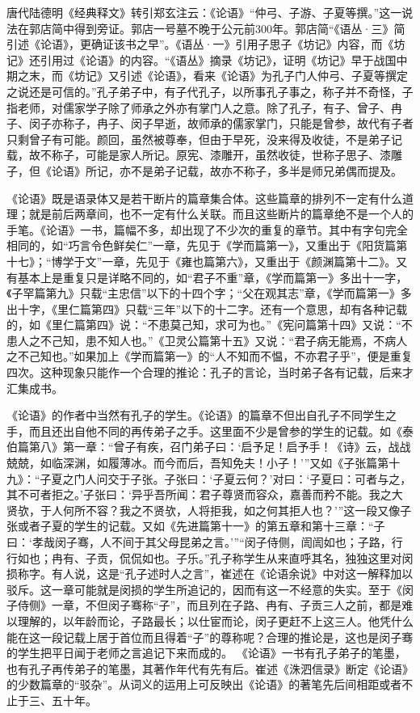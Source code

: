 \documentclass[a4paper,12pt,UTF8,twoside]{ctexbook}
\begin{document}
唐代陆德明《经典释文》转引郑玄注云：《论语》“仲弓、子游、子夏等撰。”这一说法在郭店简中得到旁证。郭店一号墓不晚于公元前300年。郭店简“《语丛·三》简引述《论语》，更确证该书之早”。《语丛·一》引用子思子《坊记》内容，而《坊记》还引用过《论语》的内容。“《语丛》摘录《坊记》，证明《坊记》早于战国中期之末，而《坊记》又引述《论语》，看来《论语》为孔子门人仲弓、子夏等撰定之说还是可信的。”孔子弟子中，有子代孔子，以所事孔子事之，称子并不奇怪，子指老师，对儒家学子除了师承之外亦有掌门人之意。除了孔子，有子、曾子、冉子、闵子亦称子，冉子、闵子早逝，故师承的儒家掌门，只能是曾参，故代有子者只剩曾子有可能。颜回，虽然被尊奉，但由于早死，没来得及收徒，不是弟子记载，故不称子，可能是家人所记。原宪、漆雕开，虽然收徒，世称子思子、漆雕子，但《论语》所记，亦不是弟子记载，故亦不称子，多半是师兄弟偶而提及。

《论语》既是语录体又是若干断片的篇章集合体。这些篇章的排列不一定有什么道理；就是前后两章间，也不一定有什么关联。而且这些断片的篇章绝不是一个人的手笔。《论语》一书，篇幅不多，却出现了不少次的重复的章节。其中有字句完全相同的，如“巧言令色鲜矣仁”一章，先见于《学而篇第一》，又重出于《阳货篇第十七》；“博学于文”一章，先见于《雍也篇第六》，又重出于《颜渊篇第十二》。又有基本上是重复只是详略不同的，如“君子不重”章，《学而篇第一》多出十一字，《子罕篇第九》只载“主忠信”以下的十四个字；“父在观其志”章，《学而篇第一》多出十字，《里仁篇第四》只载“三年”以下的十二字。还有一个意思，却有各种记载的，如《里仁篇第四》说：“不患莫己知，求可为也。”《宪问篇第十四》又说：“不患人之不己知，患不知人也。”《卫灵公篇第十五》又说：“君子病无能焉，不病人之不己知也。”如果加上《学而篇第一》的“人不知而不愠，不亦君子乎”，便是重复四次。这种现象只能作一个合理的推论：孔子的言论，当时弟子各有记载，后来才汇集成书。

《论语》的作者中当然有孔子的学生。《论语》的篇章不但出自孔子不同学生之手，而且还出自他不同的再传弟子之手。这里面不少是曾参的学生的记载。如《泰伯篇第八》第一章：“曾子有疾，召门弟子曰：‘启予足！启予手！《诗》云，战战兢兢，如临深渊，如履薄冰。而今而后，吾知免夫！小子！’”又如《子张篇第十九》：“子夏之门人问交于子张。子张曰：‘子夏云何？’对曰：‘子夏曰：可者与之，其不可者拒之。’子张曰：‘异乎吾所闻：君子尊贤而容众，嘉善而矜不能。我之大贤欤，于人何所不容？我之不贤欤，人将拒我，如之何其拒人也？’”这一段又像子张或者子夏的学生的记载。又如《先进篇第十一》的第五章和第十三章：“子曰：‘孝哉闵子骞，人不间于其父母昆弟之言。’”“闵子侍侧，訚訚如也；子路，行行如也；冉有、子贡，侃侃如也。子乐。”孔子称学生从来直呼其名，独独这里对闵损称字。有人说，这是“孔子述时人之言”，崔述在《论语余说》中对这一解释加以驳斥。这一章可能就是闵损的学生所追记的，因而有这一不经意的失实。至于《闵子侍侧》一章，不但闵子骞称“子”，而且列在子路、冉有、子贡三人之前，都是难以理解的，以年龄而论，子路最长；以仕宦而论，闵子更赶不上这三人。他凭什么能在这一段记载上居于首位而且得着“子”的尊称呢？合理的推论是，这也是闵子骞的学生把平日闻于老师之言追记下来而成的。
《论语》一书有孔子弟子的笔墨，也有孔子再传弟子的笔墨，其著作年代有先有后。崔述《洙泗信录》断定《论语》的少数篇章的“驳杂”。从词义的运用上可反映出《论语》的著笔先后间相距或者不止于三、五十年。
\end{document}
